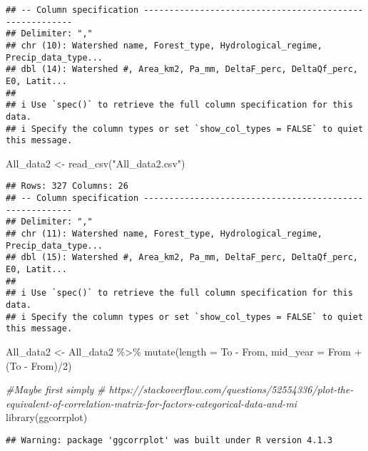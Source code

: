 \documentclass[]{elsarticle} %
\newenvironment{Shaded}{\begin{snugshade}}{\end{snugshade}}
\newcommand{\AttributeTok}[1]{\textcolor[rgb]{0.77,0.63,0.00}{#1}}
\newcommand{\CommentTok}[1]{\textcolor[rgb]{0.56,0.35,0.01}{\textit{#1}}}
\newcommand{\DecValTok}[1]{\textcolor[rgb]{0.00,0.00,0.81}{#1}}
\newcommand{\FunctionTok}[1]{\textcolor[rgb]{0.00,0.00,0.00}{#1}}
\newcommand{\NormalTok}[1]{#1}
\newcommand{\OtherTok}[1]{\textcolor[rgb]{0.56,0.35,0.01}{#1}}
\newcommand{\SpecialCharTok}[1]{\textcolor[rgb]{0.00,0.00,0.00}{#1}}
\newcommand{\StringTok}[1]{\textcolor[rgb]{0.31,0.60,0.02}{#1}}
\begin{document}
\begin{verbatim}
## -- Column specification --------------------------------------------------------
## Delimiter: ","
## chr (10): Watershed name, Forest_type, Hydrological_regime, Precip_data_type...
## dbl (14): Watershed #, Area_km2, Pa_mm, DeltaF_perc, DeltaQf_perc, E0, Latit...
## 
## i Use `spec()` to retrieve the full column specification for this data.
## i Specify the column types or set `show_col_types = FALSE` to quiet this message.
\end{verbatim}

\begin{Shaded}
\begin{Highlighting}[]
\NormalTok{All\_data2 }\OtherTok{\textless{}{-}} \FunctionTok{read\_csv}\NormalTok{(}\StringTok{"All\_data2.csv"}\NormalTok{)}
\end{Highlighting}
\end{Shaded}

\begin{verbatim}
## Rows: 327 Columns: 26
## -- Column specification --------------------------------------------------------
## Delimiter: ","
## chr (11): Watershed name, Forest_type, Hydrological_regime, Precip_data_type...
## dbl (15): Watershed #, Area_km2, Pa_mm, DeltaF_perc, DeltaQf_perc, E0, Latit...
## 
## i Use `spec()` to retrieve the full column specification for this data.
## i Specify the column types or set `show_col_types = FALSE` to quiet this message.
\end{verbatim}

\begin{Shaded}
\begin{Highlighting}[]
\NormalTok{All\_data2 }\OtherTok{\textless{}{-}}\NormalTok{ All\_data2 }\SpecialCharTok{\%\textgreater{}\%}
  \FunctionTok{mutate}\NormalTok{(}\AttributeTok{length =}\NormalTok{ To }\SpecialCharTok{{-}}\NormalTok{ From,}
         \AttributeTok{mid\_year =}\NormalTok{ From }\SpecialCharTok{+}\NormalTok{ (To }\SpecialCharTok{{-}}\NormalTok{ From)}\SpecialCharTok{/}\DecValTok{2}\NormalTok{)}

\CommentTok{\#Maybe first simply}
\CommentTok{\# https://stackoverflow.com/questions/52554336/plot{-}the{-}equivalent{-}of{-}correlation{-}matrix{-}for{-}factors{-}categorical{-}data{-}and{-}mi}
\FunctionTok{library}\NormalTok{(ggcorrplot)}
\end{Highlighting}
\end{Shaded}

\begin{verbatim}
## Warning: package 'ggcorrplot' was built under R version 4.1.3
\end{verbatim}
\end{document}
